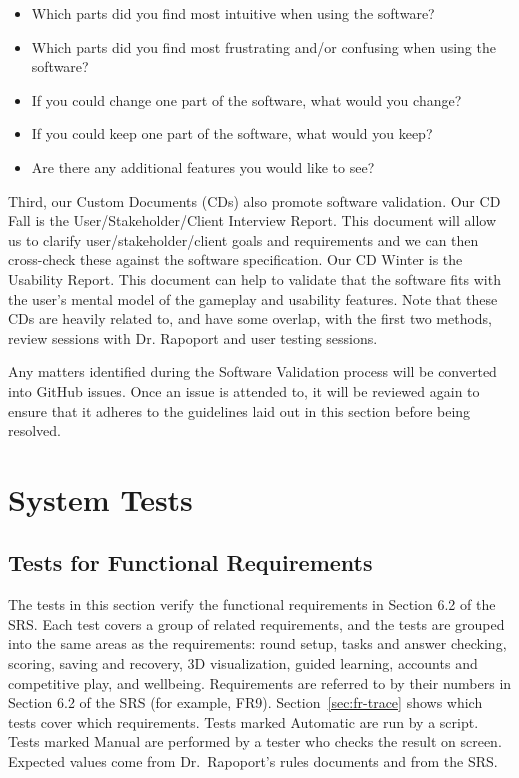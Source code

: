 \documentclass[12pt, titlepage]{article}
\begin{document}
\begin{itemize}
  \item Which parts did you find most intuitive when using the software?
  \item Which parts did you find most frustrating and/or confusing when using the software?
  \item If you could change one part of the software, what would you change?
  \item If you could keep one part of the software, what would you keep?
  \item Are there any additional features you would like to see?
\end{itemize}

Third, our Custom Documents (CDs) also promote software validation. Our CD Fall is the User/Stakeholder/Client Interview Report. This document will allow us to clarify user/stakeholder/client goals and requirements and we can then cross-check these against the software specification. Our CD Winter is the Usability Report. This document can help to validate that the software fits with the user's mental model of the gameplay and usability features. Note that these CDs are heavily related to, and have some overlap, with the first two methods, review sessions with Dr. Rapoport and user testing sessions. 

Any matters identified during the Software Validation process will be converted into GitHub issues. Once an issue is attended to, it will be reviewed again to ensure that it adheres to the guidelines laid out in this section before being resolved.

\section{System Tests}
\label{sec:SysTest}

\subsection{Tests for Functional Requirements}
\label{sec:fr-tests}

The tests in this section verify the functional requirements in Section 6.2 of the SRS. Each test covers a group of related requirements, and the tests are grouped into the same areas as the requirements: round setup, tasks and answer checking, scoring, saving and recovery, 3D visualization, guided learning, accounts and competitive play, and wellbeing. Requirements are referred to by their numbers in Section 6.2 of the SRS (for example, FR9). Section~\ref{sec:fr-trace} shows which tests cover which requirements. Tests marked Automatic are run by a script. Tests marked Manual are performed by a tester who checks the result on screen. Expected values come from Dr.\ Rapoport's rules documents and from the SRS.
\end{document}
